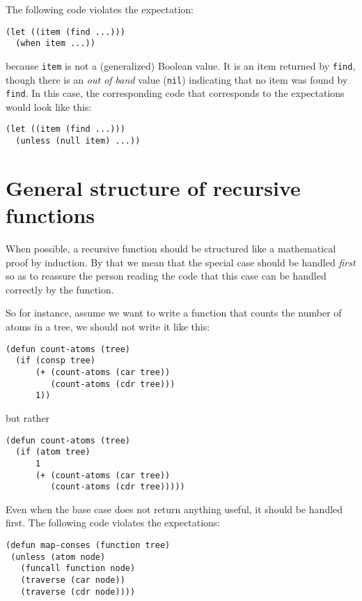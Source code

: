 The following code violates the expectation:

\begin{verbatim}
(let ((item (find ...)))
  (when item ...))
\end{verbatim}

because \texttt{item} is not a (generalized) Boolean value.  It is an
item returned by \texttt{find}, though there is an \emph{out of band}
value (\texttt{nil}) indicating that no item was found by
\texttt{find}.  In this case, the corresponding code that corresponds
to the expectations would look like this:

\begin{verbatim}
(let ((item (find ...)))
  (unless (null item) ...))
\end{verbatim}

\section{General structure of recursive functions}

When possible, a recursive function should be structured like a
mathematical proof by induction.  By that we mean that the special
case should be handled \emph{first} so as to reassure the person
reading the code that this case can be handled correctly by the
function.


So for instance, assume we want to write a function that counts
the number of atoms in a tree, we should not write it like this:

\begin{verbatim}
(defun count-atoms (tree)
  (if (consp tree)
      (+ (count-atoms (car tree))
         (count-atoms (cdr tree)))
      1))
\end{verbatim}

but rather

\begin{verbatim}
(defun count-atoms (tree)
  (if (atom tree)
      1
      (+ (count-atoms (car tree))
         (count-atoms (cdr tree)))))
\end{verbatim}

Even when the base case does not return anything useful, it should be
handled first.  The following code violates the expectations:

\begin{verbatim}
(defun map-conses (function tree)
 (unless (atom node)
   (funcall function node)
   (traverse (car node))
   (traverse (cdr node))))
\end{verbatim}

